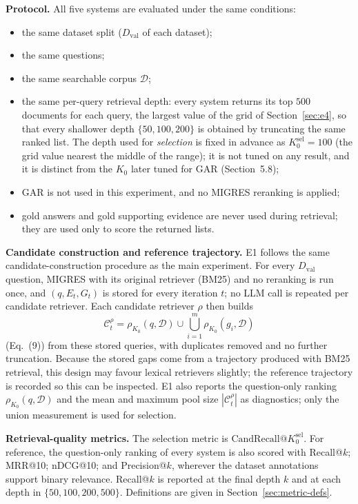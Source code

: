\documentclass[11pt,a4paper]{article}
\begin{document}
\textbf{Protocol.} All five systems are evaluated under the same conditions:
\begin{itemize}[leftmargin=1.5em]
\item the same dataset split ($D_{\mathrm{val}}$ of each dataset);
\item the same questions;
\item the same searchable corpus $\mathcal{D}$;
\item the same per-query retrieval depth: every system returns its top $500$ documents for each query, the largest value of the grid of Section~\ref{sec:e4}, so that every shallower depth $\{50,100,200\}$ is obtained by truncating the same ranked list. The depth used for \emph{selection} is fixed in advance as $K_0^{\mathrm{sel}}=100$ (the grid value nearest the middle of the range); it is not tuned on any result, and it is distinct from the $K_0$ later tuned for GAR (Section~5.8);
\item GAR is not used in this experiment, and no MIGRES reranking is applied;
\item gold answers and gold supporting evidence are never used during retrieval; they are used only to score the returned lists.
\end{itemize}
\textbf{Candidate construction and reference trajectory.} E1 follows the same candidate-construction procedure as the main experiment. For every $D_{\mathrm{val}}$ question, MIGRES with its original retriever (BM25) and no reranking is run once, and $(q,E_t,G_t)$ is stored for every iteration $t$; no LLM call is repeated per candidate retriever. Each candidate retriever $\rho$ then builds
\[
\mathcal{C}_t^{\rho}=\rho_{K_0}(q,\mathcal{D})\cup\bigcup_{i=1}^{m}\rho_{K_0}(g_i,\mathcal{D})
\]
(Eq.~(9)) from these stored queries, with duplicates removed and no further truncation. Because the stored gaps come from a trajectory produced with BM25 retrieval, this design may favour lexical retrievers slightly; the reference trajectory is recorded so this can be inspected. E1 also reports the question-only ranking $\rho_{K_0}(q,\mathcal{D})$ and the mean and maximum pool size $|\mathcal{C}_t^{\rho}|$ as diagnostics; only the union measurement is used for selection.

\textbf{Retrieval-quality metrics.} The selection metric is $\mathrm{CandRecall}@K_0^{\mathrm{sel}}$. For reference, the question-only ranking of every system is also scored with Recall@$k$; MRR@10; nDCG@10; and Precision@$k$, wherever the dataset annotations support binary relevance. Recall@$k$ is reported at the final depth $k$ and at each depth in $\{50,100,200,500\}$. Definitions are given in Section~\ref{sec:metric-defs}.
\end{document}
